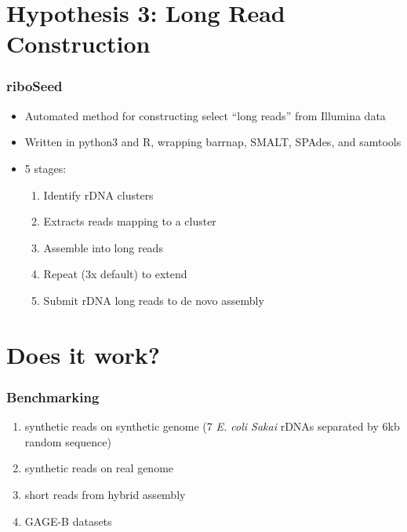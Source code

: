 \documentclass[10pt, compress]{beamer}
\begin{document}
\section{Hypothesis 3: Long Read Construction}


\begin{frame}[fragile]
  \frametitle{riboSeed}
  \begin{itemize}
  \item Automated method for constructing select ``long reads'' from Illumina data
  \item Written in python3 and R, wrapping barrnap, SMALT, SPAdes, and samtools
  \item 5 stages:
  \begin{enumerate}
    \item Identify rDNA clusters
    \item Extracts reads mapping to a cluster
    \item Assemble into long reads
    \item Repeat (3x default) to extend
    \item Submit rDNA long reads to de novo assembly

  \end{enumerate}
  \end{itemize}

\end{frame}

\section{Does it work?}

\begin{frame}[fragile]
  \frametitle{Benchmarking}
  \begin{enumerate}
  \item synthetic reads on synthetic genome (7 \textit{E. coli Sakai} rDNAs separated by 6kb random sequence)
  \item synthetic reads on real genome
  \item short reads from hybrid assembly
  \item GAGE-B datasets
  \end{enumerate}

\end{frame}
\end{document}
